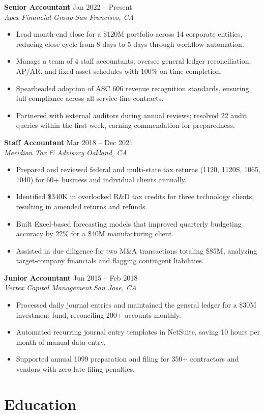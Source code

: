 \documentclass[11pt,letterpaper]{article}
\newcommand{\cvdate}[1]{{\small\color{accentblue}#1}}
\newcommand{\cventry}[5]{
  \textbf{#1} \hfill \cvdate{#2} \\
  \textit{#3} \hfill \textit{#4} \\
  \vspace{-4pt}
  \begin{itemize}[leftmargin=*,nosep,itemsep=1pt,topsep=2pt]
    #5
  \end{itemize}
  \vspace{2pt}
}
\begin{document}
\cventry{Senior Accountant}{Jan 2022 -- Present}
  {Apex Financial Group}{San Francisco, CA}
  {
    \item Lead month-end close for a \$120M portfolio across 14 corporate entities, reducing close cycle from 8 days to 5 days through workflow automation.
    \item Manage a team of 4 staff accountants; oversee general ledger reconciliation, AP/AR, and fixed asset schedules with 100\% on-time completion.
    \item Spearheaded adoption of ASC 606 revenue recognition standards, ensuring full compliance across all service-line contracts.
    \item Partnered with external auditors during annual reviews; resolved 22 audit queries within the first week, earning commendation for preparedness.
  }

\cventry{Staff Accountant}{Mar 2018 -- Dec 2021}
  {Meridian Tax \& Advisory}{Oakland, CA}
  {
    \item Prepared and reviewed federal and multi-state tax returns (1120, 1120S, 1065, 1040) for 60+ business and individual clients annually.
    \item Identified \$340K in overlooked R\&D tax credits for three technology clients, resulting in amended returns and refunds.
    \item Built Excel-based forecasting models that improved quarterly budgeting accuracy by 22\% for a \$40M manufacturing client.
    \item Assisted in due diligence for two M\&A transactions totaling \$85M, analyzing target-company financials and flagging contingent liabilities.
  }

\cventry{Junior Accountant}{Jun 2015 -- Feb 2018}
  {Vertex Capital Management}{San Jose, CA}
  {
    \item Processed daily journal entries and maintained the general ledger for a \$30M investment fund, reconciling 200+ accounts monthly.
    \item Automated recurring journal entry templates in NetSuite, saving 10 hours per month of manual data entry.
    \item Supported annual 1099 preparation and filing for 350+ contractors and vendors with zero late-filing penalties.
  }

\section{Education}
\end{document}
